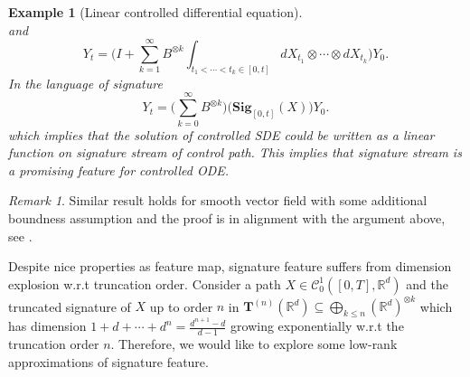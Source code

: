 \documentclass[12pt]{report}
\newtheorem{example}[theorem]{Example}
\theoremstyle{definition}
\theoremstyle{remark}
\newtheorem*{remark}{Remark}
\newcommand{\R}{\mathbb{R}}
\begin{document}
\begin{example}[Linear controlled differential equation]
\begin{equation}
  \end{equation}
  and
  \begin{equation} 
    Y_{t} = \Bigg(I + \sum_{k=1}^{\infty}B^{\otimes k}\int_{t_{1}<\cdots< t_{k} \in [0,t]}dX_{t_{1}}\otimes\cdots\otimes dX_{t_{k}}\Bigg) Y_{0}.
  \end{equation}
  In the language of signature 
  \begin{equation} 
    Y_{t} = \Big(\sum_{k=0}^{\infty}B^{\otimes k}\Big) \Big(\mathbf{Sig}_{[0,t]}(X)\Big) Y_{0}.
  \end{equation}
  which implies that the solution of controlled SDE could be written as a linear function on signature stream of control path. This implies that signature stream is a promising feature for controlled ODE.
\end{example}
\begin{remark}
  Similar result holds for smooth vector field with some additional boundness assumption and the proof is in alignment with the argument above, see \cite{liao2019learning}. 
\end{remark}
Despite nice properties as feature map, signature feature suffers from dimension explosion w.r.t truncation order. Consider a path $X \in \mathcal{C}^{1}_{0}([0,T],\R^{d})$ and the truncated signature of $X$ up to order $n$ in $\mathbf{T}^{(n)}(\R^{d}) \subseteq \bigoplus_{k\leq n} (\R^{d})^{\otimes k} $ which has dimension $1 + d + \cdots + d^{n} = \frac{d^{n+1} - d}{d-1}$ growing exponentially w.r.t the truncation order $n$. Therefore, we would like to explore some low-rank approximations of signature feature. 
\end{document}
